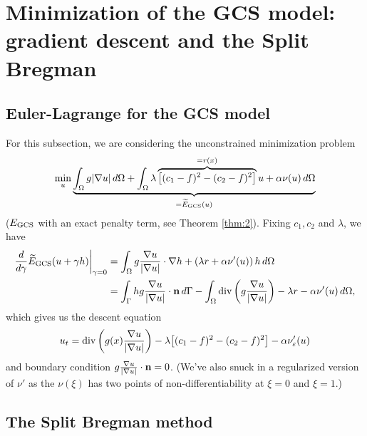 \section{Minimization of the GCS model: gradient descent and the Split Bregman}
\subsection{Euler-Lagrange for the GCS model}
For this subsection, we are considering the unconstrained minimization problem 
\begin{align*}
\min_u \underbrace{\int_{\Omega } g\lvert\nabla u\rvert \,d\Omega 
+ \int_{\Omega} \lambda \overbrace{\big[ (c_1 - f)^2 - (c_2 - f)^2 \big]}^{=r(x)} u + \alpha \nu(u) \,d\Omega }_{=\widetilde E_{\textrm{GCS}}(u)}
\end{align*}
($E_\textrm{GCS}$ with an exact penalty term, see Theorem \ref{thm:2}).
Fixing $c_1, c_2$ and $\lambda$, we have
\begin{align*}
\frac{d}{d\gamma} \widetilde E_\textrm{GCS}(u + \gamma h)
\bigg\rvert_{\gamma = 0} 
&= \int_{\Omega} g \frac{\nabla u}{\lvert\nabla u\rvert} \cdot \nabla h
+ \left( \lambda r + \alpha \nu'(u) \right) h \,d\Omega 
\\
&= \int_{\Gamma} h g \frac{\nabla u}{\lvert\nabla u\rvert} \cdot \mathbf{n}  \, d \Gamma - \int_{\Omega } \operatorname{div}\left( g \frac{\nabla u}{\lvert\nabla u\rvert} \right) - \lambda r - \alpha \nu'(u) \,d\Omega ,
\end{align*}
which gives us the descent equation 
\begin{align*}
u_t = \operatorname{div}\left( g(x)  \frac{\nabla u}{\lvert\nabla u\rvert} \right) - \lambda\big[ (c_1 - f)^2 - (c_2 - f)^2 \big]  - \alpha \nu_\varepsilon'(u)
\end{align*}
and boundary condition $g\frac{\nabla u}{\lvert\nabla u\rvert} \cdot \mathbf{n} = 0$. (We've also snuck in a regularized version of $\nu'$ as the $\nu(\xi)$ has two points of non-differentiability at $\xi = 0$ and $\xi = 1$.)

\subsection{The Split Bregman method}

